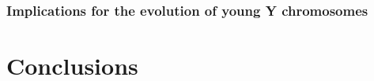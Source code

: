 \documentclass[9pt,twocolumn,twoside]{gsajnl}
\begin{document}



\subsubsection*{Implications for the evolution of young Y chromosomes}

\section*{Conclusions}
\end{document}
